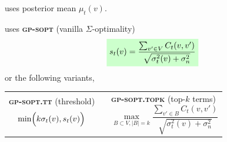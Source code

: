 \documentclass[size36_42,landscape]{a0poster}
\def\CBOX#1{\colorbox{yellow}{#1}}
\newenvironment{coldinglist}[2]	    {
\begin{list}
  {\textcolor{#2}{\ding{#1}}}{
\setlength{\parskip}{0pt}
\setlength{\itemsep}{0pt}
\setlength{\parsep}{0pt}
}
	}
	{\end{list}}
\def\be{{\bf e}}
\begin{document}
\begin{multicols}{3}
\begin{coldinglist}{112}{blue}



    \item {} uses posterior mean $\mu_t(v)$.
    \item {} uses
 \textbf{\textsc{gp-sopt}} (vanilla $\Sigma$-optimality)
        \begin{equation}
      \tikz[baseline]{\node[fill=green!20]{$\displaystyle
 s_t(v)=\frac{\sum_{v'\in V}C_t(v,v')}{\sqrt{\sigma_t^2(v)+\sigma_n^2}}
            $};}
        	\label{eq:sopt.orig}
        \end{equation}
    or the following variants,
    
\begin{tabular}{lcl}
\begin{minipage}[t]{.4\linewidth}
\textbf{\textsc{gp-sopt.tt}} (threshold)
		\begin{equation}
			\min\Bigl(k \sigma_{t}(v), s_t(v) \Bigr)
			\label{eq:sopt.tt}
		\end{equation}
		\end{minipage} 
&\phantom{...}&
\begin{minipage}[t]{.57\linewidth}
\textbf{\textsc{gp-sopt.topk}} (top-$k$ terms)
		\begin{equation}
			\max_{B \subset V, |B| = k}  \frac{\sum_{v' \in B} C_{t}(v,v')}{\sqrt{\sigma_t^2(v)+\sigma_n^2}}
			\label{eq:sopt.topk}
		\end{equation}
		\end{minipage}
		\end{tabular}
	

\end{coldinglist}
\end{multicols}
\end{document}
